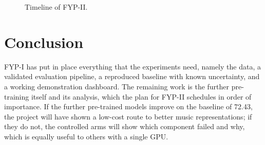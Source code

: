 \begin{figure}[htbp]
\centering
{}
\caption[Timeline of FYP-II]{Timeline of FYP-II.}
\label{fig:concl-gantt}
\end{figure}

\FloatBarrier
\section{Conclusion}
\label{sec:concl-conclusion}
FYP-I has put in place everything that the experiments need, namely the data, a validated evaluation pipeline, a reproduced baseline with known uncertainty, and a working demonstration dashboard. The remaining work is the further pre-training itself and its analysis, which the plan for FYP-II schedules in order of importance. If the further pre-trained models improve on the baseline of 72.43, the project will have shown a low-cost route to better music representations; if they do not, the controlled arms will show which component failed and why, which is equally useful to others with a single GPU.
